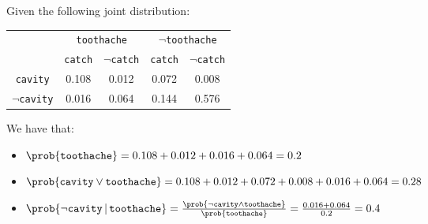 \begin{example}
    Given the following joint distribution:
    \begin{center}
        \begin{tabular}{|c|c|c|c|c|}
            \cline{2-5}
            \multicolumn{1}{c|}{}    & \multicolumn{2}{c|}{\texttt{toothache}} & \multicolumn{2}{c|}{$\lnot$\texttt{toothache}} \\
            \cline{2-5}
            \multicolumn{1}{c|}{}    & \texttt{catch} & $\lnot$\texttt{catch} & \texttt{catch} & $\lnot$\texttt{catch} \\
            \hline
            \texttt{cavity}         & 0.108 & 0.012 & 0.072 & 0.008 \\
            \hline
            $\lnot$\texttt{cavity}  & 0.016 & 0.064 & 0.144 & 0.576 \\
            \hline
        \end{tabular}
    \end{center}

    We have that:
    \begin{itemize}
        \item $\prob{\texttt{toothache}} = 0.108 + 0.012 + 0.016 + 0.064 = 0.2$
        \item $\prob{\texttt{cavity} \vee \texttt{toothache}} = 0.108 + 0.012 + 0.072 + 0.008 + 0.016 + 0.064 = 0.28$
        \item $\prob{\lnot\texttt{cavity} \,\vert\, \texttt{toothache}} = \frac{\prob{\lnot\texttt{cavity} \land \texttt{toothache}}}{\prob{\texttt{toothache}}} =
                \frac{0.016 + 0.064}{0.2} = 0.4$
    \end{itemize}
\end{example}

